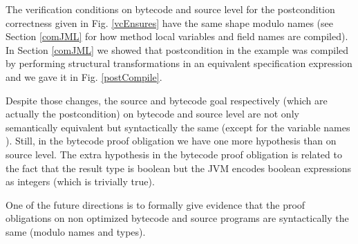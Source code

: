 The verification conditions on bytecode and source level for the postcondition  correctness given in Fig. \ref{vcEnsures}
 have the same shape modulo names (see Section \ref{comJML} for how method local variables and field names are compiled). 
 In Section \ref{comJML} we showed that postcondition in the example was compiled by performing structural transformations 
in an equivalent specification expression and we gave it in Fig. \ref{postCompile}. 

Despite those changes, the source and bytecode goal respectively (which are actually the postcondition) on bytecode and source level are not only
semantically equivalent but syntactically the same (except for the variable names ). Still, in the bytecode proof obligation we have one more hypothesis than on source level. The extra hypothesis in the bytecode proof obligation is related to the fact that the result type is boolean but the JVM encodes boolean expressions as integers (which is trivially true).


One of the future directions is to formally give evidence that the proof obligations on non optimized bytecode and source programs are syntactically the same (modulo names and types). 






%
%
%
%
%
%
%
%
%

